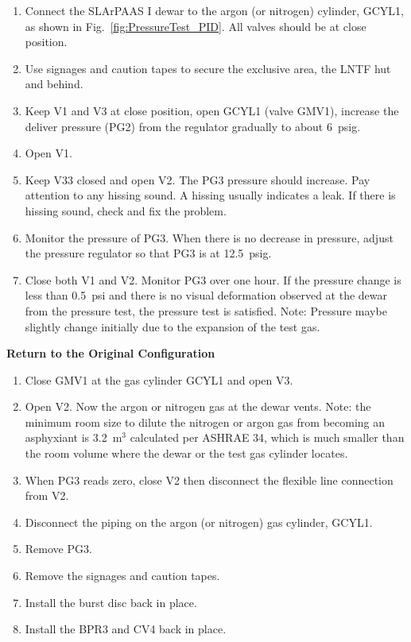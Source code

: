 \documentclass[letterpaper,11pt]{article}
\begin{document}
\begin{enumerate}
    \item Connect the SLArPAAS I dewar to the argon (or nitrogen) cylinder, GCYL1, 
    as shown in Fig.~\ref{fig:PressureTest_PID}. All valves should be at close position.
    \item Use signages and caution tapes to secure the exclusive area, the LNTF hut and behind.
    \item Keep V1 and V3 at close position, open GCYL1 (valve GMV1), increase the deliver pressure (PG2)
    from the regulator gradually to about 6~psig.
    \item Open V1.
    \item Keep V33 closed and open V2. The PG3 pressure should increase. Pay attention to any hissing
    sound. A hissing usually indicates a leak. If there is hissing sound, check and fix the problem.
    \item Monitor the pressure of PG3. When there is no decrease in pressure, adjust the pressure
    regulator so that PG3 is at 12.5~psig.
    \item Close both V1 and V2. Monitor PG3 over one hour. If the pressure change is
    less than 0.5~psi and there is no visual deformation observed at the dewar from the pressure test, 
    the pressure test is satisfied.
    Note: Pressure maybe slightly change initially due to the expansion of the test gas.
\end{enumerate}

\textbf{Return to the Original Configuration}

\begin{enumerate}
    \item Close GMV1 at the gas cylinder GCYL1 and open V3.
    \item Open V2. Now the argon or nitrogen gas at the dewar vents.
    Note: the minimum room size to dilute the nitrogen or argon gas from becoming an asphyxiant 
    is 3.2~m$^3$ calculated per ASHRAE 34, which is much smaller than the room volume where the dewar 
    or the test gas cylinder locates.
    \item When PG3 reads zero, close V2 then disconnect the flexible line connection from V2.
    \item Disconnect the piping on the argon (or nitrogen) gas cylinder, GCYL1.
    \item Remove PG3.
    \item Remove the signages and caution tapes.
    \item Install the burst disc back in place.
    \item Install the BPR3 and CV4 back in place.
\end{enumerate}
\end{document}
